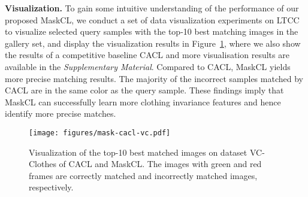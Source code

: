 \documentclass[10pt,twocolumn,letterpaper]{article}
\newcommand{\myparagraph}[1]{\noindent\textbf{#1.}}
\begin{document}
\myparagraph{Visualization}
To gain some intuitive understanding of the performance of our proposed MaskCL, we conduct a set of data visualization experiments on LTCC to visualize selected query samples with the top-10 best matching images in the gallery set, and display the visualization results in Figure~\ref{fig:vision_MaskCL_3}, where we also show the results of a competitive baseline CACL and more visualisation results are available in the {\textit{Supplementary Material}}.
Compared to CACL, MaskCL yields more precise matching results. The majority of the incorrect samples matched by CACL are in the same color as the query sample. These findings imply that MaskCL can successfully learn more clothing invariance features and hence identify more precise matches.

    \begin{figure}[!htb]
        \begin{center}
        \footnotesize
{\texttt{[image: figures/mask-cacl-vc.pdf]}}
        \end{center}
        \vspace{-6pt}
        \caption{  
        Visualization of the top-10 best matched images on dataset VC-Clothes of CACL and MaskCL. The images with green and red frames are correctly matched and incorrectly matched images, respectively.
        }
        \label{fig:vision_MaskCL_3}
        \vspace{-10pt}
        \end{figure}   
        
\end{document}
